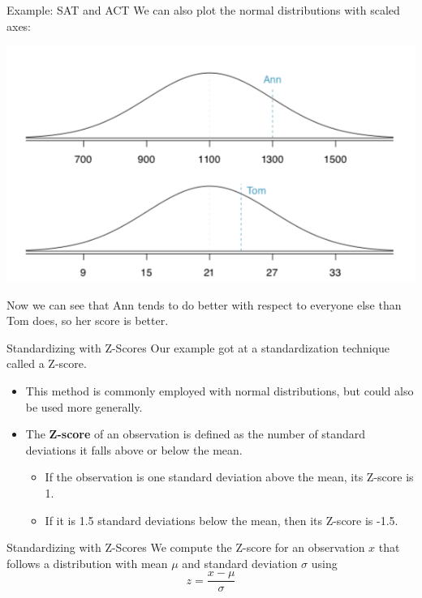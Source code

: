 \begin{frame}{Example: SAT and ACT}
    We can also plot the normal distributions with scaled axes:
    \begin{center}
        \includegraphics[scale=0.4]{images/actsat.png}
    \end{center}
    Now we can see that Ann tends to do better with respect to everyone else than Tom does, so her score is better.
\end{frame}

\begin{frame}{Standardizing with Z-Scores}
    Our example got at a standardization technique called a Z-score.
    \begin{itemize}
        \item This method is commonly employed with normal distributions, but could also be used more generally.
        \item The \textbf{Z-score} of an observation is defined as the number of standard deviations it falls above or below the mean.
        \begin{itemize}
            \item If the observation is one standard deviation above the mean, its Z-score is 1.
            \item If it is 1.5 standard deviations below the mean, then its Z-score is -1.5.
        \end{itemize}
    \end{itemize}
\end{frame}

\begin{frame}{Standardizing with Z-Scores}
    We compute the Z-score for an observation $x$ that follows a distribution with mean $\mu$ and standard deviation $\sigma$ using
    \[
        z = \frac{x-\mu}{\sigma}
    \]
\end{frame}

